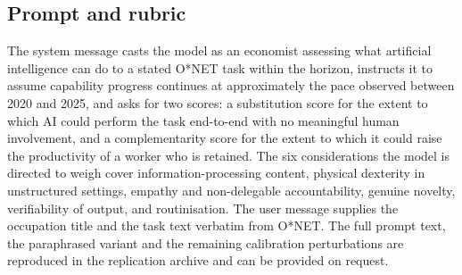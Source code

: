 \subsection{Prompt and rubric}

The system message casts the model as an economist assessing what artificial intelligence can do to a stated O*NET task within the horizon, instructs it to assume capability progress continues at approximately the pace observed between 2020 and 2025, and asks for two scores: a substitution score for the extent to which AI could perform the task end-to-end with no meaningful human involvement, and a complementarity score for the extent to which it could raise the productivity of a worker who is retained. The six considerations the model is directed to weigh cover information-processing content, physical dexterity in unstructured settings, empathy and non-delegable accountability, genuine novelty, verifiability of output, and routinisation. The user message supplies the occupation title and the task text verbatim from O*NET. The full prompt text, the paraphrased variant and the remaining calibration perturbations are reproduced in the replication archive and can be provided on request.


